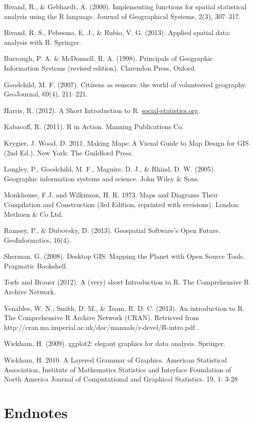 \documentclass[]{article}
\begin{document}
Bivand, R., \& Gebhardt, A. (2000). Implementing functions for spatial
statistical analysis using the R language. Journal of Geographical
Systems, 2(3), 307--317.

Bivand, R. S., Pebesma, E. J., \& Rubio, V. G. (2013). Applied spatial
data: analysis with R. Springer.

Burrough, P. A. \& McDonnell, R. A. (1998). Principals of Geographic
Information Systems (revised edition). Clarendon Press, Oxford.

Goodchild, M. F. (2007). Citizens as sensors: the world of volunteered
geography. GeoJournal, 69(4), 211--221.

Harris, R. (2012). A Short Introduction to R.
\href{http://www.social-statistics.org/}{social-statistics.org}.

Kabacoff, R. (2011). R in Action. Manning Publications Co.

Krygier, J. Wood, D. 2011. Making Maps: A Visual Guide to Map Design for
GIS (2nd Ed.). New York: The Guildford Press.

Longley, P., Goodchild, M. F., Maguire, D. J., \& Rhind, D. W. (2005).
Geographic information systems and science. John Wiley \& Sons.

Monkhouse, F.J. and Wilkinson, H. R. 1973. Maps and Diagrams Their
Compilation and Construction (3rd Edition, reprinted with revisions).
London: Methuen \& Co Ltd.

Ramsey, P., \& Dubovsky, D. (2013). Geospatial Software's Open Future.
GeoInformatics, 16(4).

Sherman, G. (2008). Desktop GIS: Mapping the Planet with Open Source
Tools. Pragmatic Bookshelf.

Torfs and Brauer (2012). A (very) short Introduction to R. The
Comprehensive R Archive Network.

Venables, W. N., Smith, D. M., \& Team, R. D. C. (2013). An introduction
to R. The Comprehensive R Archive Network (CRAN). Retrieved from
http://cran.ma.imperial.ac.uk/doc/manuals/r-devel/R-intro.pdf .

Wickham, H. (2009). ggplot2: elegant graphics for data analysis.
Springer.

Wickham, H. 2010. A Layered Grammar of Graphics. American Statistical
Association, Institute of Mathematics Statistics and Interface
Foundation of North America Journal of Computational and Graphical
Statistics. 19, 1: 3-28

\section{Endnotes}
\end{document}
